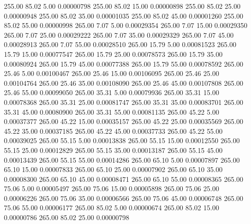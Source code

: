     255.00     85.02      5.00     0.00000798
    255.00     85.02     15.00     0.00000898
    255.00     85.02     25.00     0.00000948
    255.00     85.02     35.00     0.00001035
    255.00     85.02     45.00     0.00001260
    255.00     85.02     55.00     0.00000998
    265.00      7.07      5.00     0.00029354
    265.00      7.07     15.00     0.00029350
    265.00      7.07     25.00     0.00029222
    265.00      7.07     35.00     0.00029329
    265.00      7.07     45.00     0.00028913
    265.00      7.07     55.00     0.00028510
    265.00     15.79      5.00     0.00081523
    265.00     15.79     15.00     0.00077547
    265.00     15.79     25.00     0.00078573
    265.00     15.79     35.00     0.00080924
    265.00     15.79     45.00     0.00077388
    265.00     15.79     55.00     0.00078592
    265.00     25.46      5.00     0.00100467
    265.00     25.46     15.00     0.00106095
    265.00     25.46     25.00     0.00104764
    265.00     25.46     35.00     0.00108090
    265.00     25.46     45.00     0.00107808
    265.00     25.46     55.00     0.00099050
    265.00     35.31      5.00     0.00079936
    265.00     35.31     15.00     0.00078368
    265.00     35.31     25.00     0.00081747
    265.00     35.31     35.00     0.00083701
    265.00     35.31     45.00     0.00080900
    265.00     35.31     55.00     0.00081135
    265.00     45.22      5.00     0.00037377
    265.00     45.22     15.00     0.00035157
    265.00     45.22     25.00     0.00035569
    265.00     45.22     35.00     0.00037185
    265.00     45.22     45.00     0.00037733
    265.00     45.22     55.00     0.00039025
    265.00     55.15      5.00     0.00013838
    265.00     55.15     15.00     0.00012550
    265.00     55.15     25.00     0.00012829
    265.00     55.15     35.00     0.00013187
    265.00     55.15     45.00     0.00013439
    265.00     55.15     55.00     0.00014286
    265.00     65.10      5.00     0.00007897
    265.00     65.10     15.00     0.00007833
    265.00     65.10     25.00     0.00007902
    265.00     65.10     35.00     0.00008300
    265.00     65.10     45.00     0.00008471
    265.00     65.10     55.00     0.00008365
    265.00     75.06      5.00     0.00005497
    265.00     75.06     15.00     0.00005898
    265.00     75.06     25.00     0.00006226
    265.00     75.06     35.00     0.00006566
    265.00     75.06     45.00     0.00006748
    265.00     75.06     55.00     0.00006177
    265.00     85.02      5.00     0.00000674
    265.00     85.02     15.00     0.00000786
    265.00     85.02     25.00     0.00000798
